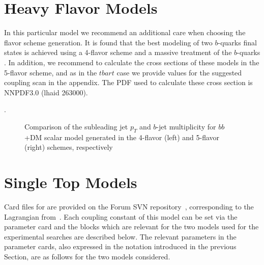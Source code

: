 \section{Heavy Flavor Models} 
In this particular model we recommend an additional care when choosing
the flavor scheme generation. 
It is found that the best modeling of two $b$-quarks final states is
achieved using a 4-flavor scheme and a massive treatment of the
$b$-quarks .
In addition, we recommend to calculate the cross sections of these
models in the 5-flavor scheme, and as in the $t bar t$ case we provide 
values for the suggested coupling scan in the appendix. 
The PDF used to calculate these cross section is NNPDF3.0 (lhaid 263000). 

.

\begin{figure}
  \vbox{\hfill}
  \caption{Comparison of the subleading jet $p_T$ and $b$-jet multiplicity
    for $bb$+DM scalar model generated in the 4-flavor (left) and 5-flavor (right)
    schemes, respectively}
\end{figure}

\section{Single Top Models}

Card files for \madgraph are provided on the Forum SVN repository~\cite{ForumSVN_EWMonoTop}, 
corresponding to the Lagrangian from~\cite{AndreaFuksMaltoni}. 
Each coupling constant of this model can be set via the parameter card and 
the blocks which are relevant for the two models used for the experimental searches are described below.
The relevant parameters in the \madgraph parameter cards, also expressed in the notation introduced in the 
previous Section, are as follows for the two models considered.

